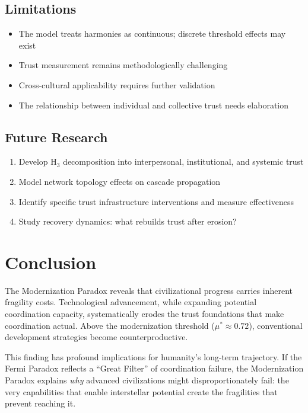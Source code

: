 \documentclass[11pt,a4paper]{article}
\begin{document}
\subsection{Limitations}

\begin{itemize}
    \item The model treats harmonies as continuous; discrete threshold effects may exist
    \item Trust measurement remains methodologically challenging
    \item Cross-cultural applicability requires further validation
    \item The relationship between individual and collective trust needs elaboration
\end{itemize}

\subsection{Future Research}

\begin{enumerate}
    \item Develop H$_3$ decomposition into interpersonal, institutional, and systemic trust
    \item Model network topology effects on cascade propagation
    \item Identify specific trust infrastructure interventions and measure effectiveness
    \item Study recovery dynamics: what rebuilds trust after erosion?
\end{enumerate}

\section{Conclusion}

The Modernization Paradox reveals that civilizational progress carries inherent fragility costs. Technological advancement, while expanding potential coordination capacity, systematically erodes the trust foundations that make coordination actual. Above the modernization threshold ($\mu^* \approx 0.72$), conventional development strategies become counterproductive.

This finding has profound implications for humanity's long-term trajectory. If the Fermi Paradox reflects a ``Great Filter'' of coordination failure, the Modernization Paradox explains \textit{why} advanced civilizations might disproportionately fail: the very capabilities that enable interstellar potential create the fragilities that prevent reaching it.
\end{document}
